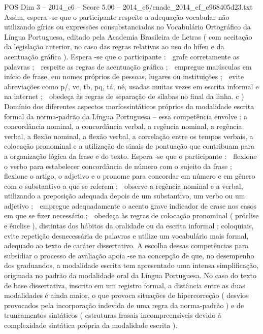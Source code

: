 \begin{textsample}{POS Dim 3 – 2014\_c6 – Score 5.00 – 2014\_c6/enade\_2014\_ef\_e968405d23.txt}
Assim, espera -se que o participante respeite a adequação vocabular não utilizando gírias ou expressões consubstanciadas no Vocabulário Ortográfico da Língua Portuguesa, editado pela Academia Brasileira de Letras ( com aceitação da legislação anterior, no caso das regras relativas ao uso do hífen e da acentuação gráfica ).
Espera -se que o participante :  grafe corretamente as palavras ;  respeite as regras de acentuação gráfica ;  empregue maiúsculas em início de frase, em nomes próprios de pessoas, lugares ou instituições ;  evite abreviações como p/, vc, tb, pq, tá, né, usadas muitas vezes em escrita informal e na internet ;  obedeça às regras de separação de sílabas no final da linha. c ) Domínio dos diferentes aspectos morfossintáticos próprios da modalidade escrita formal da norma-padrão da Língua Portuguesa – essa competência envolve : a concordância nominal, a concordância verbal, a regência nominal, a regência verbal, a flexão nominal, a flexão verbal, a correlação entre os tempos verbais, a colocação pronominal e a utilização de sinais de pontuação que contribuam para a organização lógica da frase e do texto.
Espera -se que o participante :  flexione o verbo para estabelecer concordância de número com o sujeito da frase ;  flexione o artigo, o adjetivo e o pronome para concordar em número e em gênero com o substantivo a que se referem ;  observe a regência nominal e a verbal, utilizando a preposição adequada depois de um substantivo, um verbo ou um adjetivo ;  empregue adequadamente o acento grave indicador de crase nos casos em que se fizer necessário ;  obedeça às regras de colocação pronominal ( próclise e ênclise ), distintas dos hábitos da oralidade ou da escrita informal ; coloquiais, evite repetição desnecessária de palavras e utilize um vocabulário mais formal, adequado ao texto de caráter dissertativo.
A escolha dessas competências para subsidiar o processo de avaliação apoia -se na concepção de que, no desempenho dos graduandos, a modalidade escrita tem apresentado uma intensa simplificação, originada no padrão da modalidade oral da Língua Portuguesa.
No caso do texto de base dissertativa, inscrito em um registro formal, a distância entre as duas modalidades é ainda maior, o que provoca situações de hipercorreção ( desvios provocados pela incorporação indevida de uma regra da norma-padrão ) e de truncamentos sintáticos ( estruturas frasais incompreensíveis devido à complexidade sintática própria da modalidade escrita ).

\end{textsample}
